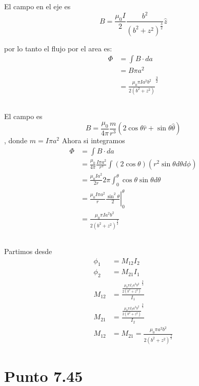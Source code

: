\documentclass{report}
\begin{document}
\section{}
El campo en el eje es \[B = \frac{\mu_0 I}{2}\frac{b^2}{(b^2 + z^2)^{\frac{3}{2}}}\hat{z}\]

por lo tanto el flujo por el area es:
\begin{align*}
	\Phi &= \int B \cdot da\\
	&= B \pi a^2\\
	&= \frac{\mu_0 \pi I a^2 b^2}{2(b^2 + z^2)}^{\frac{3}{2}}
\end{align*}

\section{}

El campo es \[B = \frac{\mu_0}{4\pi}\frac{m}{r^3}(2\cos\theta \hat{r} + \sin\theta\hat{\theta})\], donde $m = I\pi a^2$ Ahora si integramos
\begin{align*}
	\Phi &= \int B \cdot da\\
	&= \frac{\mu_0}{4\pi}\frac{I\pi a^2}{r^3} \int (2\cos\theta)(r^2\sin\theta d\theta d\phi)\\
	&= \frac{\mu_0 I a^2}{2r} 2\pi \int_0^\theta \cos\theta\sin\theta d\theta\\
	&= \frac{\mu_0 I \pi a^2}{r}\left.\frac{\sin^2\theta}{2}\right|_0^\theta\\
	&= \frac{\mu_0 \pi I a^2 b^2}{2(b^2 + z^2)^{\frac{3}{2}}}
\end{align*}

\section{}

Partimos desde
\begin{align*}
	\phi_1 &= M_{12} I_2\\
	\phi_2 &= M_{21} I_1\\
	M_{12}&= \frac{\frac{\mu_0 \pi I_1 a^2 b^2}{2(b^2 + z^2)}^{\frac{3}{2}}}{I_1}\\
	M_{21}&= \frac{\frac{\mu_0 \pi I_2 a^2 b^2}{2(b^2 + z^2)}^{\frac{3}{2}}}{I_2}\\
	M_{12} &= M_{21} = \frac{\mu_0 \pi a^2 b^2}{2(b^2 + z^2)^{\frac{3}{2}}}
\end{align*}

\chapter{Punto 7.45}
\end{document}
